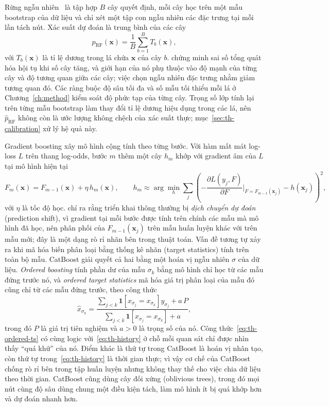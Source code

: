 \documentclass[12pt,a4paper]{report}
\begin{document}
Rừng ngẫu nhiên~\parencite{breiman2001} là tập hợp $B$ cây quyết định, mỗi cây học trên một mẫu bootstrap của dữ liệu và chỉ xét một tập con ngẫu nhiên các đặc trưng tại mỗi lần tách nút. Xác suất dự đoán là trung bình của các cây
\begin{equation}\label{eq:th-rf}
  \hat{p}_{\mathrm{RF}}(\mathbf{x}) = \frac{1}{B} \sum_{b=1}^{B} T_b(\mathbf{x}),
\end{equation}
với $T_b(\mathbf{x})$ là tỉ lệ dương trong lá chứa $\mathbf{x}$ của cây $b$. \textcite{breiman2001} chứng minh sai số tổng quát hóa hội tụ khi số cây tăng, và giới hạn của nó phụ thuộc vào độ mạnh của từng cây và độ tương quan giữa các cây; việc chọn ngẫu nhiên đặc trưng nhằm giảm tương quan đó. Các ràng buộc độ sâu tối đa và số mẫu tối thiểu mỗi lá ở Chương~\ref{ch:method} kiểm soát độ phức tạp của từng cây. Trọng số lớp tính lại trên từng mẫu bootstrap làm thay đổi tỉ lệ dương hiệu dụng trong các lá, nên $\hat p_{\mathrm{RF}}$ không còn là ước lượng không chệch của xác suất thực; mục~\ref{sec:th-calibration} xử lý hệ quả này.

Gradient boosting xây mô hình cộng tính theo từng bước. Với hàm mất mát log-loss $L$ trên thang log-odds, bước $m$ thêm một cây $h_m$ khớp với gradient âm của $L$ tại mô hình hiện tại
\begin{equation}\label{eq:th-gb}
  F_m(\mathbf{x}) = F_{m-1}(\mathbf{x}) + \eta\, h_m(\mathbf{x}), \qquad
  h_m \approx \arg\min_h \sum_{j} \left( -\frac{\partial L(y_j, F)}{\partial F}\Big|_{F=F_{m-1}(\mathbf{x}_j)} - h(\mathbf{x}_j) \right)^2,
\end{equation}
với $\eta$ là tốc độ học. \textcite{prokhorenkova2018} chỉ ra rằng triển khai thông thường bị \emph{dịch chuyển dự đoán} (prediction shift), vì gradient tại mỗi bước được tính trên chính các mẫu mà mô hình đã học, nên phân phối của $F_{m-1}(\mathbf{x}_j)$ trên mẫu huấn luyện khác với trên mẫu mới; đây là một dạng rò rỉ nhãn bên trong thuật toán. Vấn đề tương tự xảy ra khi mã hóa biến phân loại bằng thống kê nhãn (target statistics) tính trên toàn bộ mẫu. CatBoost giải quyết cả hai bằng một hoán vị ngẫu nhiên $\sigma$ của dữ liệu. \emph{Ordered boosting} tính phần dư của mẫu $\sigma_k$ bằng mô hình chỉ học từ các mẫu đứng trước nó, và \emph{ordered target statistics} mã hóa giá trị phân loại của mẫu đó cũng chỉ từ các mẫu đứng trước, theo công thức
\begin{equation}\label{eq:th-ordered-ts}
  \hat{x}_{\sigma_k} =
  \frac{\sum_{j<k} \mathbf{1}\!\left[x_{\sigma_j} = x_{\sigma_k}\right] y_{\sigma_j} + a\,P}
       {\sum_{j<k} \mathbf{1}\!\left[x_{\sigma_j} = x_{\sigma_k}\right] + a},
\end{equation}
trong đó $P$ là giá trị tiên nghiệm và $a > 0$ là trọng số của nó. Công thức~\eqref{eq:th-ordered-ts} có cùng logic với~\eqref{eq:th-history} ở chỗ mỗi quan sát chỉ được nhìn thấy ``quá khứ'' của nó. Điểm khác là thứ tự trong CatBoost là hoán vị nhân tạo, còn thứ tự trong~\eqref{eq:th-history} là thời gian thực; vì vậy cơ chế của CatBoost chống rò rỉ bên trong tập huấn luyện nhưng không thay thế cho việc chia dữ liệu theo thời gian. CatBoost cũng dùng cây đối xứng (oblivious trees), trong đó mọi nút cùng độ sâu dùng chung một điều kiện tách, làm mô hình ít bị quá khớp hơn và dự đoán nhanh hơn.
\end{document}
